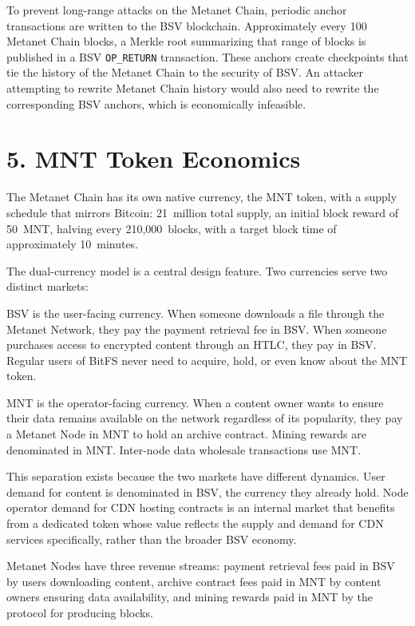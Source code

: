 \documentclass[11pt,a4paper]{article}
\begin{document}
To prevent long-range attacks on the Metanet Chain, periodic anchor transactions are written to the BSV blockchain. Approximately every 100 Metanet Chain blocks, a Merkle root summarizing that range of blocks is published in a BSV \texttt{OP\_RETURN} transaction. These anchors create checkpoints that tie the history of the Metanet Chain to the security of BSV. An attacker attempting to rewrite Metanet Chain history would also need to rewrite the corresponding BSV anchors, which is economically infeasible.

\section{5. MNT Token Economics}

The Metanet Chain has its own native currency, the MNT token, with a supply schedule that mirrors Bitcoin: 21~million total supply, an initial block reward of 50~MNT, halving every 210,000~blocks, with a target block time of approximately 10~minutes.

The dual-currency model is a central design feature. Two currencies serve two distinct markets:

BSV is the user-facing currency. When someone downloads a file through the Metanet Network, they pay the payment retrieval fee in BSV. When someone purchases access to encrypted content through an HTLC, they pay in BSV. Regular users of BitFS never need to acquire, hold, or even know about the MNT token.

MNT is the operator-facing currency. When a content owner wants to ensure their data remains available on the network regardless of its popularity, they pay a Metanet Node in MNT to hold an archive contract. Mining rewards are denominated in MNT. Inter-node data wholesale transactions use MNT.

This separation exists because the two markets have different dynamics. User demand for content is denominated in BSV, the currency they already hold. Node operator demand for CDN hosting contracts is an internal market that benefits from a dedicated token whose value reflects the supply and demand for CDN services specifically, rather than the broader BSV economy.

Metanet Nodes have three revenue streams: payment retrieval fees paid in BSV by users downloading content, archive contract fees paid in MNT by content owners ensuring data availability, and mining rewards paid in MNT by the protocol for producing blocks.
\end{document}
